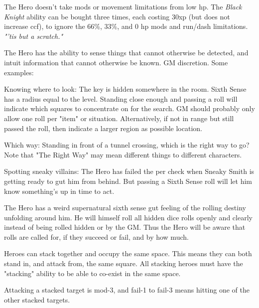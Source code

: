  The Hero doesn't take mods or movement limitations from low hp. The \emph{Black Knight} ability can be bought three times, each costing 30xp (but does not increase ccf), to ignore the 66\%, 33\%, and 0 hp mods and run/dash limitations. \emph{"'tis but a scratch."}


 The Hero has the ability to sense things that cannot otherwise be detected, and intuit information that cannot otherwise be known. GM discretion. Some examples:

Knowing where to look: The key is hidden somewhere in the room. Sixth Sense has a radius equal to the level. Standing close enough and passing a roll will indicate which squares to concentrate on for the search. GM should probably only allow one roll per "item" or situation. Alternatively, if not in range but still passed the roll, then indicate a larger region as possible location.

Which way: Standing in front of a tunnel crossing, which is the right way to go? Note that "The Right Way" may mean different things to different characters.

Spotting sneaky villains: The Hero has failed the per check when Sneaky Smith is getting ready to gut him from behind. But passing a Sixth Sense roll will let him know something's up in time to act.


 The Hero has a weird supernatural sixth sense gut feeling of the rolling destiny unfolding around him. He will himself roll all hidden dice rolls openly and clearly instead of being rolled hidden or by the GM. Thus the Hero will be aware that rolls are called for, if they succeed or fail, and by how much.


 Heroes can stack together and occupy the same space. This means they can both stand in, and attack from, the same square. All stacking heroes must have the "stacking" ability to be able to co-exist in the same space.

Attacking a stacked target is mod-3, and fail-1 to fail-3 means hitting one of the other stacked targets.


